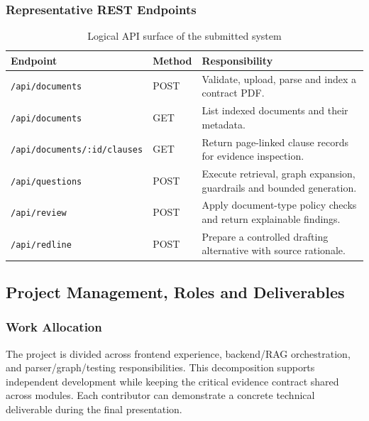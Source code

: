 \documentclass[12pt,a4paper,oneside]{report}
\begin{document}
\subsubsection{Representative REST Endpoints}
\begin{table}[H]
\centering
\begin{tabularx}{\textwidth}{p{}p{}X}
\toprule
\textbf{Endpoint} & \textbf{Method} & \textbf{Responsibility}\\
\midrule
\texttt{/api/documents} & POST & Validate, upload, parse and index a contract PDF.\\
\texttt{/api/documents} & GET & List indexed documents and their metadata.\\
\nolinkurl{/api/documents/:id/clauses} & GET & Return page-linked clause records for evidence inspection.\\
\texttt{/api/questions} & POST & Execute retrieval, graph expansion, guardrails and bounded generation.\\
\texttt{/api/review} & POST & Apply document-type policy checks and return explainable findings.\\
\texttt{/api/redline} & POST & Prepare a controlled drafting alternative with source rationale.\\
\bottomrule
\end{tabularx}
\caption{Logical API surface of the submitted system}
\end{table}


\subsection{Project Management, Roles and Deliverables}

\subsubsection{Work Allocation}
The project is divided across frontend experience, backend/RAG orchestration, and parser/graph/testing responsibilities. This decomposition supports independent development while keeping the critical evidence contract shared across modules. Each contributor can demonstrate a concrete technical deliverable during the final presentation.
\end{document}
